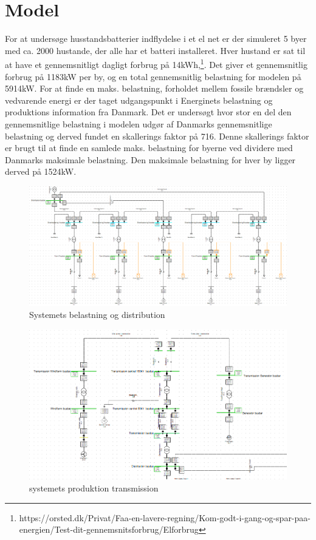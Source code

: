 
\label{Modelopbygning}

\section{Model}

For at undersøge husstandsbatterier indflydelse i et el net er der simuleret 5 byer med ca. 2000 hustande, der alle har et batteri installeret. Hver hustand er sat til at have et gennemsnitligt dagligt forbrug på 14kWh,\footnote{https://orsted.dk/Privat/Faa-en-lavere-regning/Kom-godt-i-gang-og-spar-paa-energien/Test-dit-gennemsnitsforbrug/Elforbrug}. Det giver et gennemsnitlig forbrug på 1183kW per by, og en total gennemsnitlig belastning for modelen på 5914kW. For at finde en maks. belastning, forholdet mellem fossile brændsler og vedvarende energi er der taget udgangspunkt i Energinets belastning og produktions information fra Danmark. Det er undersøgt hvor stor en del den gennemsnitlige belastning i modelen udgør af Danmarks gennemsnitlige belastning og derved fundet en skallerings faktor på 716. Denne skallerings faktor er brugt til at finde en samlede maks. belastning for byerne ved dividere med Danmarks maksimale belastning. Den maksimale belastning for hver by ligger derved på 1524kW.

 
 \begin{figure}[H] %
 	\centering
 	\includegraphics[width=1\textwidth]{figurer/Sim_model_2}
 	\caption{Systemets belastning og distribution}
 	\label{fig:Simdis}
 \end{figure}
    



\begin{figure}[H] %
	\centering
	\includegraphics[width=1\textwidth]{figurer/Sim_model_1}
	\caption{systemets produktion transmission}
	\label{fig:SimTrans}
\end{figure}
